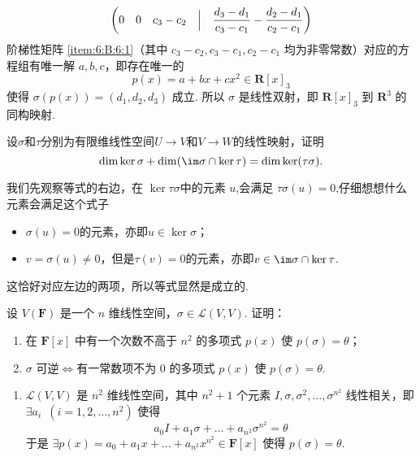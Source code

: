 \begin{exercise}
\begin{exgroup}
\begin{answer}
\begin{align}
\begin{pmatrix}
                                   0 & 0   & c_3 - c_2 & \Bigm| & \dfrac{d_3 - d_1}{c_3 - c_1} - \dfrac{d_2 - d_1}{c_2 - c_1}
                               \end{pmatrix} \label{item:6:B:6:1}
          \end{align}
          阶梯性矩阵 \ref*{item:6:B:6:1}（其中 $ c_3 - c_2, c_3 - c_1, c_2 - c_1 $ 均为非零常数）对应的方程组有唯一解 $ a, b, c $，即存在唯一的
          \[ p(x) = a + bx + cx^2 \in \mathbf{R}[x]_3 \]
          使得 $ \sigma(p(x)) = (d_1, d_2, d_3) $ 成立. 所以 $ \sigma $ 是线性双射，即 $ \mathbf{R}[x]_3 $ 到 $ \mathbf{R}^3 $ 的同构映射.
        \end{answer}

        \item 设$\sigma$和$\tau$分别为有限维线性空间$U\to V$和$V\to W$的线性映射，证明
        \[\dim\ker\sigma+\dim(\im\sigma\cap\ker\tau)=\dim\ker(\tau\sigma).\]

        \begin{answer}
            我们先观察等式的右边，在 $\ker \tau \sigma$中的元素 $u$,会满足 $\tau \sigma (u) = 0 $,仔细想想什么元素会满足这个式子
            \begin{itemize}
                \item $\sigma(u)=0$的元素，亦即$u\in \ker \sigma$；
                \item $v=\sigma(u)\neq 0$，但是$\tau(v)=0$的元素，亦即$v\in \im \sigma \cap \ker \tau$.
            \end{itemize}
            这恰好对应左边的两项，所以等式显然是成立的.
        \end{answer}
    \end{exgroup}

    \begin{exgroup}
        \item 设 $V(\mathbf{F})$ 是一个 $n$ 维线性空间，$\sigma \in \mathcal{L}(V,V)$. 证明：
        \begin{enumerate}
            \item 在 $\mathbf{F}[x]$ 中有一个次数不高于 $n^2$ 的多项式 $p(x)$ 使 $p(\sigma) = \theta$；

            \item $\sigma$ 可逆$\iff$有一常数项不为 0 的多项式 $p(x)$ 使 $p(\sigma) = \theta$.
        \end{enumerate}
        \begin{answer}
            \begin{enumerate}
                \item \label{item:5:C:1:1}
                      $ \mathcal{L}(V, V) $ 是 $ n^2 $ 维线性空间，其中 $ n^2 + 1 $ 个元素 $ I, \sigma, \sigma^2, \ldots, \sigma^{n^2} $ 线性相关，即 $ \exists a_i\enspace (i = 1, 2, \ldots, n^2) $ 使得
                      \[ a_0 I + a_1 \sigma + \ldots + a_{n^2} \sigma^{n^2} = \theta \]
                      于是 $ \exists p(x) = a_0 + a_1 x + \ldots + a_{n^2} x^{n^2} \in \mathbf{F}[x] $ 使得 $ p(\sigma) = \theta $.


\end{enumerate}
\end{answer}
\end{exgroup}
\end{exercise}

